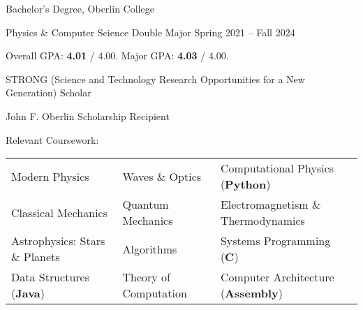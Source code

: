 \begin{entry}{Bachelor's Degree, Oberlin College}

	\entryItem
		{Physics \& Computer Science Double Major}
		{Spring 2021 -- Fall 2024}

	\begin{items}
		\item Overall GPA: \textbf{4.01} / 4.00. Major GPA: \textbf{4.03} / 4.00.
		
		\item STRONG (Science and Technology Research Opportunities for a New Generation) Scholar

		\item John F. Oberlin Scholarship Recipient
		
		\item Relevant Coursework:
		
			\begin{tabular}{lll}
				Modern Physics & Waves \& Optics & Computational Physics (\textbf{Python}) \\
				Classical Mechanics & Quantum Mechanics & Electromagnetism \& Thermodynamics \\
				Astrophysics: Stars \& Planets & Algorithms & Systems Programming (\textbf{C}) \\
				Data Structures (\textbf{Java}) & Theory of Computation & Computer Architecture (\textbf{Assembly}) \\
			\end{tabular}
		\end{items}
		
\end{entry}
\vspace*{-0.2cm}
